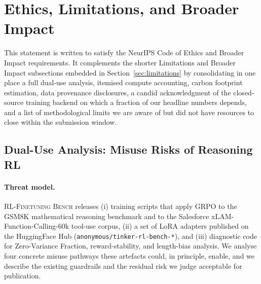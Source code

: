 \documentclass{article}
\newcommand{\ours}{\textsc{RL-Finetuning Bench}}
\begin{document}
\section{Ethics, Limitations, and Broader Impact}
\label{sec:impact_standalone}

This statement is written to satisfy the NeurIPS Code of Ethics and Broader
Impact requirements. It complements the shorter Limitations and Broader
Impact subsections embedded in Section~\ref{sec:limitations} by consolidating
in one place a full dual-use analysis, itemised compute accounting, carbon
footprint estimation, data provenance disclosures, a candid acknowledgment
of the closed-source training backend on which a fraction of our headline
numbers depends, and a list of methodological limits we are aware of but
did not have resources to close within the submission window.

\subsection{Dual-Use Analysis: Misuse Risks of Reasoning RL}
\label{sec:dualuse}


\paragraph{Threat model.}
\ours{} releases (i) training scripts that apply GRPO to the GSM8K
\cite{cobbe2021training} mathematical reasoning benchmark and to the
Salesforce xLAM-Function-Calling-60k \cite{liu2024xlam} tool-use corpus,
(ii) a set of LoRA adapters published on the HuggingFace Hub
(\texttt{anonymous/tinker-rl-bench-*}), and (iii) diagnostic code for
Zero-Variance Fraction, reward-stability, and length-bias analysis. We
analyse four concrete misuse pathways these artefacts could, in principle,
enable, and we describe the existing guardrails and the residual risk we
judge acceptable for publication.
\end{document}
